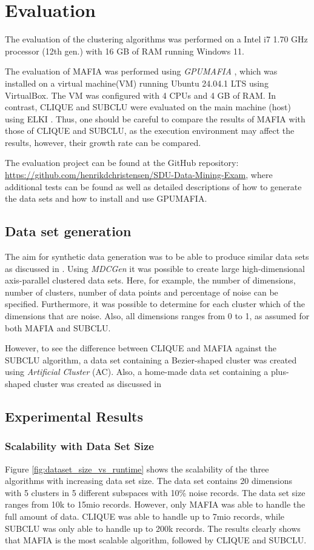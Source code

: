 \section{Evaluation}
The evaluation of the clustering algorithms was performed on a Intel i7 1.70 GHz processor (12th gen.) with 16 GB of RAM running Windows 11.

The evaluation of MAFIA was performed using \textit{GPUMAFIA} \cite{gpumafia}, which was installed on a virtual machine(VM) running Ubuntu 24.04.1 LTS using VirtualBox. The VM was configured with 4 CPUs and 4 GB of RAM. In contrast, CLIQUE and SUBCLU were evaluated on the main machine (host) using ELKI \cite{elki}. Thus, one should be careful to compare the results of MAFIA with those of CLIQUE and SUBCLU, as the execution environment may affect the results, however, their growth rate can be compared.

The evaluation project can be found at the GitHub repository: \url{https://github.com/henrikdchristensen/SDU-Data-Mining-Exam}, where additional tests can be found as well as detailed descriptions of how to generate the data sets and how to install and use GPUMAFIA.

\subsection{Data set generation}
The aim for synthetic data generation was to be able to produce similar data sets as discussed in \cite{mafia}. Using \textit{MDCGen} it was possible to create large high-dimensional axis-parallel clustered data sets. Here, for example, the number of dimensions, number of clusters, number of data points and percentage of noise can be specified. Furthermore, it was possible to determine for each cluster which of the dimensions that are noise. Also, all dimensions ranges from 0 to 1, as assumed for both MAFIA and SUBCLU.

However, to see the difference between CLIQUE and MAFIA against the SUBCLU algorithm, a data set containing a Bezier-shaped cluster was created using \textit{Artificial Cluster} (AC). Also, a home-made data set containing a plus-shaped cluster was created as discussed in \cite{mafia}

\subsection{Experimental Results}

\subsubsection{Scalability with Data Set Size}
Figure \ref{fig:dataset_size_vs_runtime} shows the scalability of the three algorithms with increasing data set size. The data set contains 20 dimensions with 5 clusters in 5 different subspaces with 10\% noise records. The data set size ranges from 10k to 15mio records. However, only MAFIA was able to handle the full amount of data. CLIQUE was able to handle up to 7mio records, while SUBCLU was only able to handle up to 200k records. The results clearly shows that MAFIA is the most scalable algorithm, followed by CLIQUE and SUBCLU.

